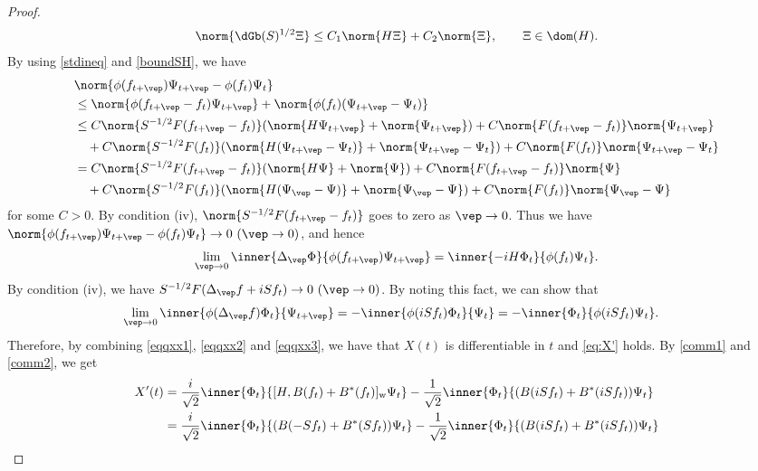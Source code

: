 \documentclass[12pt]{article}
\theoremstyle{plain}
\numberwithin{equation}{section}
\theoremstyle{remark}
\begin{document}
\begin{proof}
\begin{align}
  \norm{\dGb(S)^{1/2}\Xi} \leq C_1\norm{H\Xi}+C_2\norm{\Xi}, \qquad \Xi\in\dom(H).
 \label{boundSH}
\end{align}
By using \eqref{stdineq} and \eqref{boundSH}, we have
\begin{align*}
&\norm{\phi(f_{t+\vep})\Psi_{t+\vep} - \phi(f_t)\Psi_t} \\
&\leq \norm{\phi(f_{t+\vep}-f_t) \Psi_{t+\vep}} + \norm{\phi(f_t) (\Psi_{t+\vep}-\Psi_t)}\\
&\leq C\norm{S^{-1/2}F(f_{t+\vep}-f_t)} (\norm{H\Psi_{t+\vep}} + \norm{\Psi_{t+\vep}})
  + C\norm{F(f_{t+\vep}-f_t)} \norm{\Psi_{t+\vep}} \\
&\quad  + C\norm{S^{-1/2}F(f_t)} (\norm{H(\Psi_{t+\vep}-\Psi_t)} + \norm{\Psi_{t+\vep}-\Psi_t})
  + C\norm{F(f_t)} \norm{\Psi_{t+\vep}-\Psi_t}  \\
&= C\norm{S^{-1/2}F(f_{t+\vep}-f_t)} (\norm{H\Psi} + \norm{\Psi})
  + C\norm{F(f_{t+\vep}-f_t)} \norm{\Psi} \\
&\quad  + C\norm{S^{-1/2}F(f_t)} (\norm{H(\Psi_\vep-\Psi)} + \norm{\Psi_\vep-\Psi})
  + C\norm{F(f_t)} \norm{\Psi_\vep-\Psi}
\end{align*}
for some $C>0$.
By condition (iv), $\norm{S^{-1/2}F(f_{t+\vep}-f_t)}$ goes to zero as $\vep\to 0$.
Thus we have $\norm{\phi(f_{t+\vep})\Psi_{t+\vep} - \phi(f_t)\Psi_t}\to 0\ (\vep \to 0)$, and hence
\begin{align}
  \lim_{\vep\to 0}  \inner{\Delta_\vep\Phi}{\phi(f_{t+\vep})\Psi_{t+\vep}}
 = \inner{-iH\Phi_t}{\phi(f_t)\Psi_t}. \label{eqqxx2}
\end{align}
By condition (iv), we have $S^{-1/2}F(\Delta_\vep f+iSf_t)\to 0\ (\vep\to 0)$.
By noting this fact, we can show that 
\begin{align}
&\lim_{\vep\to 0} \inner{\phi(\Delta_\vep f)\Phi_t}{\Psi_{t+\vep}}
 = -\inner{\phi(iSf_t)\Phi_t}{\Psi_t}
 = -\inner{\Phi_t}{\phi(iSf_t)\Psi_t}. \label{eqqxx3}
\end{align}
Therefore, by combining \eqref{eqqxx1}, \eqref{eqqxx2} and \eqref{eqqxx3}, 
we have that $X(t)$ is differentiable in $t$ and \eqref{eq:X'} holds.
By \eqref{comm1} and \eqref{comm2}, we get 
\begin{align*}
X'(t) 
&= \frac{i}{\sqrt{2}}\inner{\Phi_t}{[H,B(f_t)+B^*(f_t)]_\mathrm{w}\Psi_t}
  -\frac{1}{\sqrt{2}}\inner{\Phi_t}{(B(iSf_t)+B^*(iSf_t))\Psi_t} \\
&= \frac{i}{\sqrt{2}}\inner{\Phi_t}{(B(-Sf_t) + B^*(Sf_t))\Psi_t}
  -\frac{1}{\sqrt{2}}\inner{\Phi_t}{(B(iSf_t)+B^*(iSf_t))\Psi_t} \\

\end{align*}
\end{proof}
\end{document}
